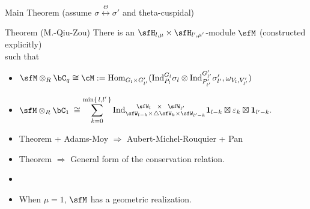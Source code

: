 \documentclass[t,mathserif,11pt,usenames,dvipsnames]{beamer}
\theoremstyle{plain}
\theoremstyle{definition}
\newcommand{\bfone}{\mathbf{1}}
\def\Hom{{\rm Hom}}
\def\Ind{{\rm Ind}}
\def\Hom{{\mathrm{Hom}}}
\begin{document}
\begin{frame}{Main Theorem (assume $\sigma\stackrel{\Theta}{\longleftrightarrow}\sigma'$ and theta-cuspidal)}

  \begin{block}{Theorem (M.-Qiu-Zou)}
    There is an $\sfH_{l,\mu}\times \sfH_{l',\mu'}$-module $\sfM$ (constructed explicitly)\\
    such that
    \begin{itemize}
      \item
            $\sfM \otimes_{R}\bC_{q} \cong \cM:=\Hom_{G_l\times G'_{l'}}(\Ind_{P_{l}}^{G_{l}}\sigma_l\otimes \Ind_{P'_{l'}}^{G'_{l'}}\sigma'_{l'}, \omega_{V_l,V'_{l'}})$ %
      \item $\sfM\otimes_{R}\bC_{1}$
            $ \cong \displaystyle\sum_{k=0}^{\min\set{l,l'}} \Ind_{\sfW_{l-k}\times \triangle \sfW_{k}\times \sfW_{l'-k}}^{\ \ \ \ \sfW_{l}\ \ \times\ \ \sfW_{l'}} \bfone_{l-k} \boxtimes \varepsilon_{k}\boxtimes\bfone_{l'-k}. $
    \end{itemize}
  \end{block}
  \begin{itemize}
    \item Theorem + Adams-Moy $\Rightarrow$ Aubert-Michel-Rouquier + Pan \pause
    \item Theorem  $\Rightarrow$ General form of the conservation relation. \pause
    \item[]
    \item When $\mu=1$, $\sfM$ has a {\color{blue} geometric realization}.
  \end{itemize}
\end{frame}
\end{document}
